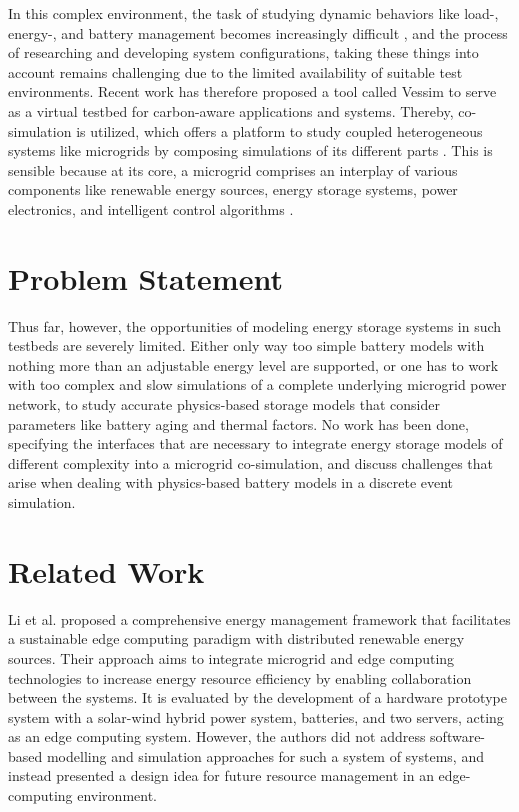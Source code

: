 \documentclass[11pt, a4paper]{report}
\begin{document}
In this complex environment, the task of studying dynamic behaviors like load-, energy-, and battery management becomes increasingly difficult \cite{yu2016distributed}, and the process of researching and developing system configurations, taking these things into account remains challenging due to the limited availability of suitable test environments. Recent work has therefore proposed a tool called Vessim \cite{wiesner2023testbed} to serve as a virtual testbed for carbon-aware applications and systems. Thereby, co-simulation is utilized, which offers a platform to study coupled heterogeneous systems like microgrids by composing simulations of its different parts \cite{gomes2018co}. This is sensible because at its core, a microgrid comprises an interplay of various components like renewable energy sources, energy storage systems, power electronics, and intelligent control algorithms \cite{alzahrani2017modeling}.

\section*{Problem Statement}
Thus far, however, the opportunities of modeling energy storage systems in such testbeds are severely limited. Either only way too simple battery models with nothing more than an adjustable energy level are supported, or one has to work with too complex and slow simulations of a complete underlying microgrid power network, to study accurate physics-based storage models that consider parameters like battery aging and thermal factors. No work has been done, specifying the interfaces that are necessary to integrate energy storage models of different complexity into a microgrid co-simulation, and discuss challenges that arise when dealing with physics-based battery models in a discrete event simulation.

\section*{Related Work}
Li et al. \cite{SustainableEdgeComputing} proposed a comprehensive energy management framework that facilitates a sustainable edge computing paradigm with distributed renewable energy sources. Their approach aims to integrate microgrid and edge computing technologies to increase energy resource efficiency by enabling collaboration between the systems. It is evaluated by the development of a hardware prototype system with a solar-wind hybrid power system, batteries, and two servers, acting as an edge computing system. However, the authors did not address software-based modelling and simulation approaches for such a system of systems, and instead presented a design idea for future resource management in an edge-computing environment.
\end{document}
